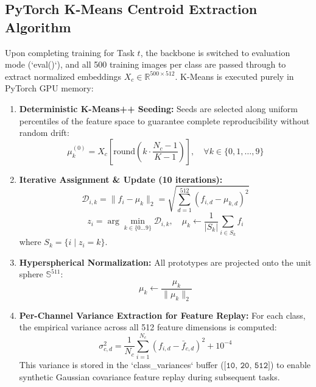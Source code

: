 \documentclass[11pt,a4paper]{article}
\newcommand{\dimtensor}[1]{\texttt{[#1]}}
\begin{document}
\subsection{PyTorch K-Means Centroid Extraction Algorithm}
Upon completing training for Task $t$, the backbone is switched to evaluation mode (`eval()`), and all 500 training images per class are passed through to extract normalized embeddings $X_c \in \mathbb{R}^{500 \times 512}$. K-Means is executed purely in PyTorch GPU memory:
\begin{enumerate}
    \item \textbf{Deterministic K-Means++ Seeding:} Seeds are selected along uniform percentiles of the feature space to guarantee complete reproducibility without random drift:
    \begin{equation}
    \mu_k^{(0)} = X_c\left[ \text{round}\left( k \cdot \frac{N_c - 1}{K - 1} \right) \right], \quad \forall k \in \{0, 1, \dots, 9\}
    \end{equation}
    \item \textbf{Iterative Assignment \& Update (10 iterations):}
    \begin{equation}
    \mathcal{D}_{i, k} = \|f_i - \mu_k\|_2 = \sqrt{\sum_{d=1}^{512} (f_{i, d} - \mu_{k, d})^2}
    \end{equation}
    \begin{equation}
    z_i = \arg\min_{k \in \{0 \dots 9\}} \mathcal{D}_{i, k}, \quad \mu_k \leftarrow \frac{1}{|S_k|} \sum_{i \in S_k} f_i
    \end{equation}
    where $S_k = \{i \mid z_i = k\}$.
    \item \textbf{Hyperspherical Normalization:} All prototypes are projected onto the unit sphere $\mathbb{S}^{511}$:
    \begin{equation}
    \mu_k \leftarrow \frac{\mu_k}{\|\mu_k\|_2}
    \end{equation}
    \item \textbf{Per-Channel Variance Extraction for Feature Replay:} For each class, the empirical variance across all 512 feature dimensions is computed:
    \begin{equation}
    \sigma_{c, d}^2 = \frac{1}{N_c} \sum_{i=1}^{N_c} (f_{i, d} - \bar{f}_{c, d})^2 + 10^{-4}
    \end{equation}
    This variance is stored in the `class_variances` buffer ($\dimtensor{10, 20, 512}$) to enable synthetic Gaussian covariance feature replay during subsequent tasks.
\end{enumerate}
\end{document}
